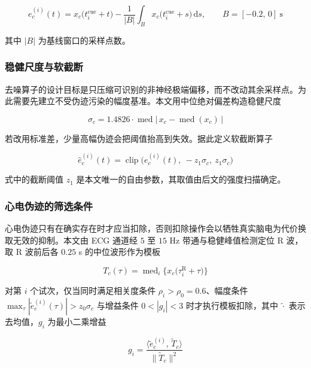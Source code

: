 \documentclass[bwprint]{gmcmthesis}
\begin{document}
\begin{equation}
e_c^{(i)}(t) = x_c\bigl(t_i^{\mathrm{cue}} + t\bigr) - \frac{1}{|B|}\int_{B} x_c\bigl(t_i^{\mathrm{cue}} + s\bigr)\,\mathrm{d}s,\qquad B = [-0.2,\,0]\ \mathrm{s}
\end{equation}

其中 $|B|$ 为基线窗口的采样点数。

\subsubsection{稳健尺度与软截断}

去噪算子的设计目标是只压缩可识别的非神经极端偏移，而不改动其余采样点。为此需要先建立不受伪迹污染的幅度基准。本文用中位绝对偏差构造稳健尺度

\begin{equation}
\sigma_c = 1.4826 \cdot \operatorname{med}\bigl|\,x_c - \operatorname{med}(x_c)\,\bigr|
\end{equation}

若改用标准差，少量高幅伪迹会把阈值抬高到失效。据此定义软截断算子

\begin{equation}
\hat e_c^{(i)}(t) = \operatorname{clip}\bigl(e_c^{(i)}(t),\ -z_1\sigma_c,\ z_1\sigma_c\bigr)
\end{equation}

式中的截断阈值 $z_1$ 是本文唯一的自由参数，其取值由后文的强度扫描确定。

\subsubsection{心电伪迹的筛选条件}

心电伪迹只有在确实存在时才应当扣除，否则扣除操作会以牺牲真实脑电为代价换取无效的抑制。本文由 ECG 通道经 $5$ 至 $15$ Hz 带通与稳健峰值检测定位 R 波，取 R 波前后各 $0.25$ s 的中位波形作为模板

\begin{equation}
T_c(\tau) = \operatorname{med}_i\bigl\{x_c\bigl(\tau_i^{\mathrm{R}} + \tau\bigr)\bigr\}
\end{equation}

对第 $i$ 个试次，仅当同时满足相关度条件 $\rho_i > \rho_0 = 0.6$、幅度条件 $\max_\tau|\tilde e_c^{(i)}(\tau)| > z_0\sigma_c$ 与增益条件 $0 < |g_i| < 3$ 时才执行模板扣除，其中 $\tilde{\cdot}$ 表示去均值，$g_i$ 为最小二乘增益

\begin{equation}
g_i = \frac{\bigl\langle \tilde e_c^{(i)},\, \tilde T_c\bigr\rangle}{\bigl\lVert \tilde T_c\bigr\rVert^2}
\end{equation}
\end{document}
